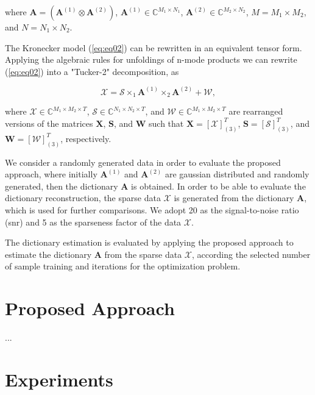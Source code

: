 where $\boldsymbol{A} = (\boldsymbol{A}^{(1)} \otimes \boldsymbol{A}^{(2)})$, $\boldsymbol{A}^{(1)} \in \mathbb{C}^{M_1 \times N_1}$, $\boldsymbol{A}^{(2)} \in \mathbb{C}^{M_2 \times N_2}$, $M = M_1 \times M_2$, and $N = N_1 \times N_2$.

The Kronecker model (\ref{eq:eq02}) can be rewritten in an equivalent tensor form. Applying the algebraic rules for unfoldings of n-mode products \cite{roemer2014tensor} we can rewrite (\ref{eq:eq02}) into a "Tucker-2" decomposition, as

\begin{equation}\label{eq:eq03}
\boldsymbol{\mathcal{X}} = \boldsymbol{\mathcal{S}} \times_1 \boldsymbol{A}^{(1)} \times_2 \boldsymbol{A}^{(2)} +  \boldsymbol{\mathcal{W}},
\end{equation}

where $\boldsymbol{\mathcal{X}} \in \mathbb{C}^{M_1 \times M_2 \times T}$, $\boldsymbol{\mathcal{S}} \in \mathbb{C}^{N_1 \times N_2 \times T}$, and $\boldsymbol{\mathcal{W}} \in \mathbb{C}^{M_1 \times M_2 \times T}$ are rearranged versions of the matrices $\boldsymbol{X}$, $\boldsymbol{S}$, and $\boldsymbol{W}$ such that $\boldsymbol{X} = [\boldsymbol{\mathcal{X}}]_{(3)}^T$, $\boldsymbol{S} = [\boldsymbol{\mathcal{S}}]_{(3)}^T$, and $\boldsymbol{W} = [\boldsymbol{\mathcal{W}}]_{(3)}^T$, respectively.

We consider a randomly generated data in order to evaluate the proposed approach, where initially $\boldsymbol{A}^{(1)}$ and $\boldsymbol{A}^{(2)}$ are gaussian distributed and randomly generated, then the dictionary $\boldsymbol{A}$ is obtained. In order to be able to evaluate the dictionary reconstruction, the sparse data $\boldsymbol{\mathcal{X}}$ is generated from the dictionary $\boldsymbol{A}$, which is used for further comparisons. We adopt 20 as the signal-to-noise ratio (snr) and 5 as the sparseness factor of the data $\boldsymbol{\mathcal{X}}$. 

The dictionary estimation is evaluated by applying the proposed approach to estimate the dictionary $\boldsymbol{A}$ from the sparse data $\boldsymbol{\mathcal{X}}$, according the selected number of sample training and iterations for the optimization problem.

\section{Proposed Approach}

...

\section{Experiments}


